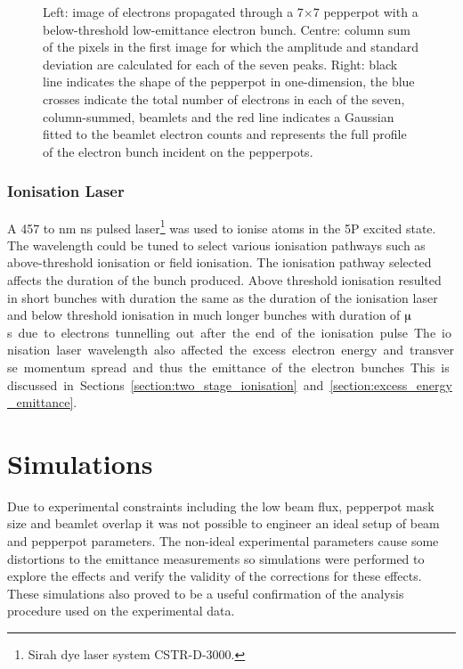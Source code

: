 \begin{figure}
    \center
    
    \caption[Determining the beam profile from a pepperpot measurement.]{Left: image of electrons propagated through a 7$\times$7 pepperpot with a below-threshold low-emittance electron bunch.
    Centre: column sum of the pixels in the first image for which the amplitude and standard deviation are calculated for each of the seven peaks.
    Right: black line indicates the shape of the pepperpot in one-dimension, the blue crosses indicate the total number of electrons in each of the seven, column-summed, beamlets and the red line indicates a Gaussian fitted to the beamlet electron counts and represents the full profile of the electron bunch incident on the pepperpots.}
    \label{figure:pepperpot_profile}
\end{figure}

\subsubsection{Ionisation Laser}
A 457 to \unit[493]{nm} \unit[5]{ns} pulsed laser\footnote{Sirah dye laser system CSTR-D-3000.} was used to ionise atoms in the 5P excited state.
The wavelength could be tuned to select various ionisation pathways such as above-threshold ionisation or field ionisation.
The ionisation pathway selected affects the duration of the bunch produced.
Above threshold ionisation resulted in short bunches with duration the same as the duration of the ionisation laser and below threshold ionisation in much longer bunches with duration of \unit[10s]{$\muup$s} due to electrons tunnelling out after the end of the ionisation pulse.

The ionisation laser wavelength also affected the excess electron energy and transverse momentum spread and thus the emittance of the electron bunches.
This is discussed in Sections~\ref{section:two_stage_ionisation} and \ref{section:excess_energy_emittance}.

\section{Simulations}\label{section:pepperpot_simulations}

Due to experimental constraints including the low beam flux, pepperpot mask size and beamlet overlap it was not possible to engineer an ideal setup of beam and pepperpot parameters.
The non-ideal experimental parameters cause some distortions to the emittance measurements so simulations were performed to explore the effects and verify the validity of the corrections for these effects.
These simulations also proved to be a useful confirmation of the analysis procedure used on the experimental data.


